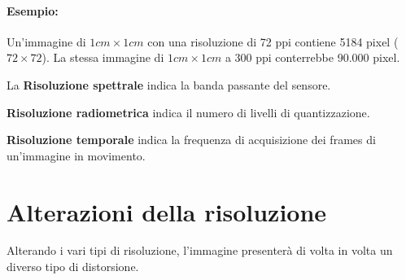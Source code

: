 \paragraph{Esempio:}

Un'immagine di $1cm \times 1cm$ con una risoluzione di 72 ppi
contiene 5184 pixel ($72 \times 72$). La stessa immagine di $1 cm \times
    1 cm$ a 300 ppi conterrebbe 90.000 pixel.

\begin{definition}
    La \textbf{Risoluzione spettrale} indica la banda passante del sensore.

\end{definition}


\begin{definition}
    \textbf{Risoluzione radiometrica} indica il numero di livelli di quantizzazione.

\end{definition}


\begin{definition}
    \textbf{Risoluzione temporale} indica la frequenza di acquisizione dei frames di un'immagine in
    movimento.
\end{definition}

\section{Alterazioni della risoluzione}

Alterando i vari tipi di risoluzione, l'immagine presenterà di volta in volta un
diverso tipo di distorsione.

